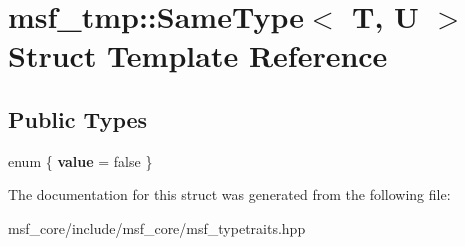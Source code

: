 \hypertarget{structmsf__tmp_1_1SameType}{\section{msf\-\_\-tmp\-:\-:Same\-Type$<$ T, U $>$ Struct Template Reference}
\label{structmsf__tmp_1_1SameType}
}
\subsection*{Public Types}
\begin{DoxyCompactItemize}
\item 
enum \{ {\bfseries value} =  false
 \}
\end{DoxyCompactItemize}


The documentation for this struct was generated from the following file\-:\begin{DoxyCompactItemize}
\item 
msf\-\_\-core/include/msf\-\_\-core/msf\-\_\-typetraits.\-hpp\end{DoxyCompactItemize}
